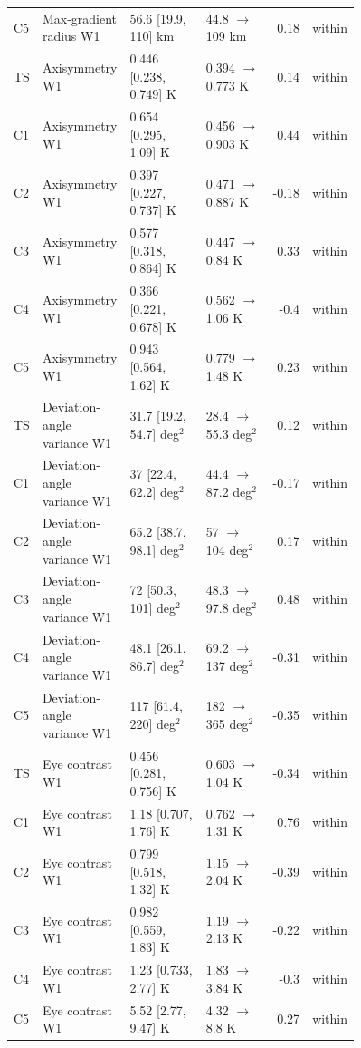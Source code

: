 \begin{supertabular}{p{0.055\linewidth}p{0.23\linewidth}p{0.25\linewidth}p{0.22\linewidth}rr}
C5 & Max-gradient radius W1 & 56.6 [19.9, 110] km & 44.8 $\rightarrow$ 109 km & 0.18 & within \\
TS & Axisymmetry W1 & 0.446 [0.238, 0.749] K & 0.394 $\rightarrow$ 0.773 K & 0.14 & within \\
C1 & Axisymmetry W1 & 0.654 [0.295, 1.09] K & 0.456 $\rightarrow$ 0.903 K & 0.44 & within \\
C2 & Axisymmetry W1 & 0.397 [0.227, 0.737] K & 0.471 $\rightarrow$ 0.887 K & -0.18 & within \\
C3 & Axisymmetry W1 & 0.577 [0.318, 0.864] K & 0.447 $\rightarrow$ 0.84 K & 0.33 & within \\
C4 & Axisymmetry W1 & 0.366 [0.221, 0.678] K & 0.562 $\rightarrow$ 1.06 K & -0.4 & within \\
C5 & Axisymmetry W1 & 0.943 [0.564, 1.62] K & 0.779 $\rightarrow$ 1.48 K & 0.23 & within \\
TS & Deviation-angle variance W1 & 31.7 [19.2, 54.7] deg$^2$ & 28.4 $\rightarrow$ 55.3 deg$^2$ & 0.12 & within \\
C1 & Deviation-angle variance W1 & 37 [22.4, 62.2] deg$^2$ & 44.4 $\rightarrow$ 87.2 deg$^2$ & -0.17 & within \\
C2 & Deviation-angle variance W1 & 65.2 [38.7, 98.1] deg$^2$ & 57 $\rightarrow$ 104 deg$^2$ & 0.17 & within \\
C3 & Deviation-angle variance W1 & 72 [50.3, 101] deg$^2$ & 48.3 $\rightarrow$ 97.8 deg$^2$ & 0.48 & within \\
C4 & Deviation-angle variance W1 & 48.1 [26.1, 86.7] deg$^2$ & 69.2 $\rightarrow$ 137 deg$^2$ & -0.31 & within \\
C5 & Deviation-angle variance W1 & 117 [61.4, 220] deg$^2$ & 182 $\rightarrow$ 365 deg$^2$ & -0.35 & within \\
TS & Eye contrast W1 & 0.456 [0.281, 0.756] K & 0.603 $\rightarrow$ 1.04 K & -0.34 & within \\
C1 & Eye contrast W1 & 1.18 [0.707, 1.76] K & 0.762 $\rightarrow$ 1.31 K & 0.76 & within \\
C2 & Eye contrast W1 & 0.799 [0.518, 1.32] K & 1.15 $\rightarrow$ 2.04 K & -0.39 & within \\
C3 & Eye contrast W1 & 0.982 [0.559, 1.83] K & 1.19 $\rightarrow$ 2.13 K & -0.22 & within \\
C4 & Eye contrast W1 & 1.23 [0.733, 2.77] K & 1.83 $\rightarrow$ 3.84 K & -0.3 & within \\
C5 & Eye contrast W1 & 5.52 [2.77, 9.47] K & 4.32 $\rightarrow$ 8.8 K & 0.27 & within \\

\end{supertabular}
